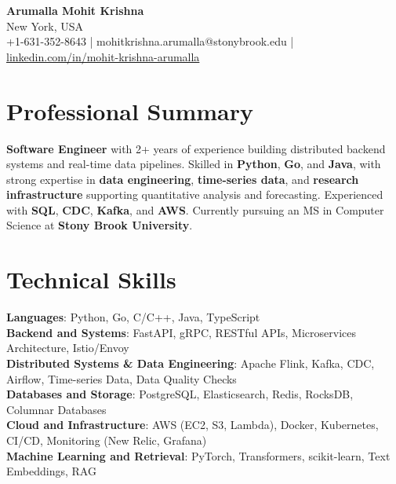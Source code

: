 \documentclass[letterpaper,11pt]{article}
\begin{document}
\begin{center}
  {\Large \textbf{Arumalla Mohit Krishna}} \\
  New York, USA \\
  +1-631-352-8643 \enspace | \enspace mohitkrishna.arumalla@stonybrook.edu \enspace | \enspace \href{https://www.linkedin.com/in/mohit-krishna-arumalla}{linkedin.com/in/mohit-krishna-arumalla}
\end{center}

\section{Professional Summary}
  \begin{itemize}[leftmargin=0.15in, label={}]
    \small{\item{
     \textbf{Software Engineer} with 2+ years of experience building distributed backend systems and real-time data pipelines. Skilled in \textbf{Python}, \textbf{Go}, and \textbf{Java}, with strong expertise in \textbf{data engineering}, \textbf{time-series data}, and \textbf{research infrastructure} supporting quantitative analysis and forecasting. Experienced with \textbf{SQL}, \textbf{CDC}, \textbf{Kafka}, and \textbf{AWS}. Currently pursuing an MS in Computer Science at \textbf{Stony Brook University}.
    }}
  \end{itemize}
\vspace{-16pt}

\section{Technical Skills}
 \begin{itemize}[leftmargin=0.15in, label={}]
    \small{\item{
     \textbf{Languages}: Python, Go, C/C++, Java, TypeScript \\
     \textbf{Backend and Systems}: FastAPI, gRPC, RESTful APIs, Microservices Architecture, Istio/Envoy \\
     \textbf{Distributed Systems \& Data Engineering}: Apache Flink, Kafka, CDC, Airflow, Time-series Data, Data Quality Checks \\
     \textbf{Databases and Storage}: PostgreSQL, Elasticsearch, Redis, RocksDB, Columnar Databases \\
     \textbf{Cloud and Infrastructure}: AWS (EC2, S3, Lambda), Docker, Kubernetes, CI/CD, Monitoring (New Relic, Grafana) \\
     \textbf{Machine Learning and Retrieval}: PyTorch, Transformers, scikit-learn, Text Embeddings, RAG
    }}
 \end{itemize}
\vspace{-16pt}
\end{document}
